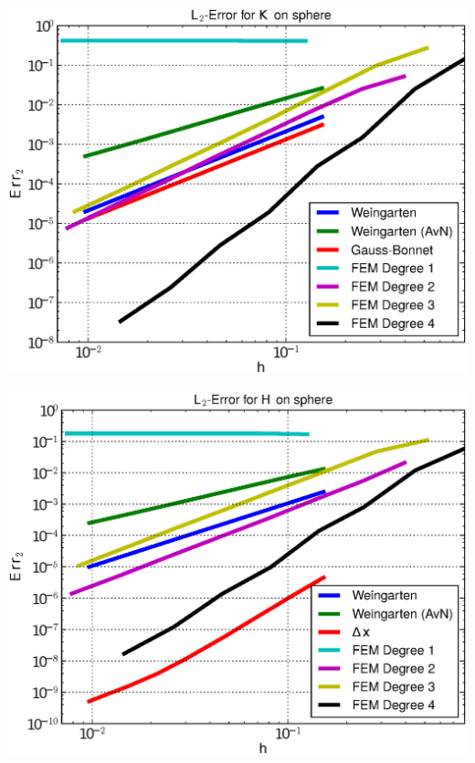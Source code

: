 \documentclass{beamer}
\begin{document}
\begin{frame}
\begin{overprint}
\begin{minipage}[t]{0.49\textwidth}
            \centering\includegraphics[width=\textwidth]{bilder/Curvature/sphere/ErrKL2_7.eps}
          \end{minipage}\hfill
          \begin{minipage}[t]{0.49\textwidth}
            \centering\includegraphics[width=\textwidth]{bilder/Curvature/sphere/ErrHL2_7.eps}
          \end{minipage}
           \begin{minipage}[t]{0.49\textwidth}

\end{minipage}
\end{overprint}
\end{frame}
\end{document}
